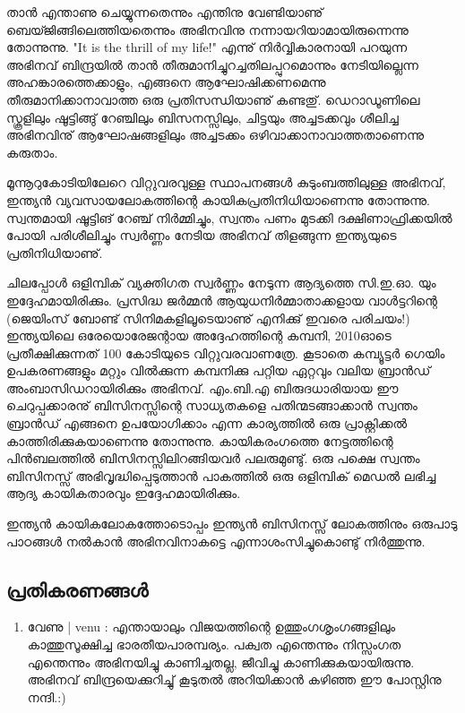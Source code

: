 ﻿
\vskip 2pt
\enlargethispage*{2\baselineskip}

താന്‍ എന്താണു ചെയ്യുന്നതെന്നും എന്തിനു വേണ്ടിയാണു് ബെയ്ജിങ്ങിലെത്തിയതെന്നും അഭിനവിനു നന്നായറിയാമായിരുന്നെന്നു തോന്നുന്നു. "It is the thrill of my life!" എന്നു് നിര്‍വ്വികാരനായി പറയുന്ന അഭിനവ് ബിന്ദ്രയില്‍ താന്‍ തീരുമാനിച്ചുറച്ചതിലപ്പുറമൊന്നും നേടിയില്ലെന്ന അഹങ്കാരത്തെക്കാളും, എങ്ങനെ ആഘോഷിക്കണമെന്നു തീരുമാനിക്കാനാവാത്ത ഒരു പ്രതിസന്ധിയാണു് കണ്ടതു്. ഡെറാഡൂണിലെ സ്കൂളിലും ഷൂട്ടിങ്ങു് റേഞ്ചിലും ബിസനസ്സിലും, ചിട്ടയും അച്ചടക്കവും ശീലിച്ച അഭിനവിനു് ആഘോഷങ്ങളിലും അച്ചടക്കം ഒഴിവാക്കാനാവാത്തതാണെന്നു കരുതാം.

മൂന്നൂറുകോടിയിലേറെ വിറ്റുവരവുള്ള സ്ഥാപനങ്ങള്‍ കുടുംബത്തിലുള്ള അഭിനവ്, ഇന്ത്യന്‍ വ്യവസായലോകത്തിന്റെ കായികപ്രതിനിധിയാണെന്നു തോന്നുന്നു. സ്വന്തമായി ഷൂട്ടിങ് റേഞ്ച് നിര്‍മ്മിച്ചും, സ്വന്തം പണം മുടക്കി ദക്ഷിണാഫ്രിക്കയില്‍ പോയി പരിശീലിച്ചും സ്വര്‍ണ്ണം നേടിയ അഭിനവ് തിളങ്ങുന്ന ഇന്ത്യയുടെ പ്രതിനിധിയാണു്.

ചിലപ്പോള്‍ ഒളിമ്പിക് വ്യക്തിഗത സ്വര്‍ണ്ണം നേടുന്ന ആദ്യത്തെ സി.ഇ.ഓ. യും ഇദ്ദേഹമായിരിക്കും. പ്രസിദ്ധ ജര്‍മ്മന്‍ ആയുധനിര്‍മ്മാതാക്കളായ വാള്‍ട്ടറിന്റെ (ജെയിംസ് ബോണ്ട് സിനിമകളിലൂടെയാണു് എനിക്കു് ഇവരെ പരിചയം!) ഇന്ത്യയിലെ ഒരേയൊരേജന്റായ അദ്ദേഹത്തിന്റെ കമ്പനി, 2010ഓടെ പ്രതീക്ഷിക്കുന്നത് 100 കോടിയുടെ വിറ്റുവരവാണത്രേ. കൂടാതെ കമ്പ്യൂട്ടര്‍ ഗെയിം ഉപകരണങ്ങളും മറ്റും വില്‍ക്കുന്ന കമ്പനിക്കു പറ്റിയ ഏറ്റവും വലിയ ബ്രാന്‍ഡ് അംബാസിഡറായിരിക്കും അഭിനവ്. എം.ബി.എ ബിരുദധാരിയായ ഈ ചെറുപ്പക്കാരനു് ബിസിനസ്സിന്റെ സാധ്യതകളെ പതിന്മടങ്ങാക്കാന്‍ സ്വന്തം ബ്രാന്‍ഡ് എങ്ങനെ ഉപയോഗിക്കാം എന്ന കാര്യത്തില്‍ ഒരു പ്രാക്റ്റിക്കല്‍ കാത്തിരിക്കുകയാണെന്നു തോന്നുന്നു. കായികരംഗത്തെ നേട്ടത്തിന്റെ പിന്‍ബലത്തില്‍ ബിസിനസ്സിലിറങ്ങിയവര്‍ പലരുമുണ്ടു്. ഒരു പക്ഷെ സ്വന്തം ബിസിനസ്സ് അഭിവൃദ്ധിപ്പെടുത്താന്‍ പാകത്തില്‍ ഒരു ഒളിമ്പിക് മെഡല്‍ ലഭിച്ച ആദ്യ കായികതാരവും ഇദ്ദേഹമായിരിക്കും.

ഇന്ത്യന്‍ കായികലോകത്തോടൊപ്പം ഇന്ത്യന്‍ ബിസിനസ്സ് ലോകത്തിനും ഒരുപാടു പാഠങ്ങള്‍ നല്‍കാന്‍ അഭിനവിനാകട്ടെ എന്നാശംസിച്ചുകൊണ്ടു് നിര്‍ത്തുന്നു.

\subsection*{പ്രതികരണങ്ങള്‍}
\begin{enumerate}
\item{വേണു | venu : }
എന്തായാലും വിജയത്തിന്റെ ഉത്തുംഗശൃംഗങ്ങളിലും കാത്തുസൂക്ഷിച്ച ഭാരതീയപാരമ്പര്യം. പക്വത എന്തെന്നും നിസ്സംഗത എന്തെന്നും അഭിനയിച്ചു കാണിച്ചതല്ല, ജീവിച്ചു കാണിക്കുകയായിരുന്നു. അഭിനവ് ബിന്ദ്രയെക്കുറിച്ചു് കൂടുതല്‍ അറിയിക്കാന്‍ കഴിഞ്ഞ ഈ പോസ്റ്റിനു നന്ദി.:)

\end{enumerate}

\newpage
